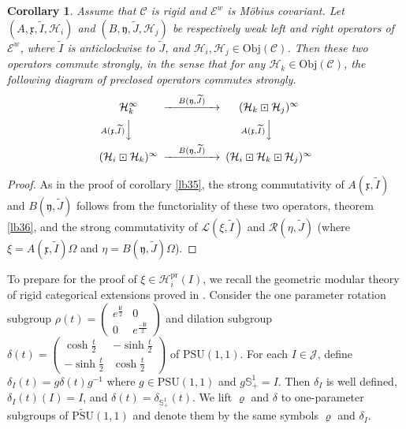 \documentclass[12pt,a4paper]{article}
\theoremstyle{definition}
\theoremstyle{plain}
\newtheorem{co}[df]{Corollary}
\newcommand{\fk}{\mathfrak}
\newcommand{\mc}{\mathcal}
\newcommand{\wtd}{\widetilde}
\newcommand{\PSU}{\mathrm{PSU}(1,1)}
\newcommand{\UPSU}{\widetilde{\mathrm{PSU}}(1,1)}
\newcommand{\scr}{\mathscr}
\newcommand{\im}{\mathbf{i}}
\newcommand{\mbb}{\mathbb}
\newcommand{\Obj}{\mathrm{Obj}}
\newcommand{\pr}{\mathrm{pr}}
\numberwithin{equation}{subsection}
\begin{document}
\begin{co}\label{lb41}
Assume that $\scr C$ is rigid and $\scr E^w$ is M\"obius covariant. Let $(A,\fk x,\wtd I,\mc H_i)$ and $(B,\fk y,\wtd J,\mc H_j)$ be respectively weak left and right operators of $\scr E^w$, where $\wtd I$ is anticlockwise to $\wtd J$, and $\mc H_i,\mc H_j\in\Obj(\scr C)$. Then these two operators commute strongly, in the sense that for any $\mc H_k\in\Obj(\scr C)$, the following diagram of preclosed operators commutes strongly.
\begin{align}
\begin{CD}
\mc H_k^\infty @> \quad B(\fk y,\wtd J)\quad   >> (\mc H_k\boxdot\mc H_j)^\infty\\
@V A(\fk x,\wtd I)   V  V @V A(\fk x,\wtd I) VV\\
(\mc H_i\boxdot\mc H_k)^\infty @> \quad B(\fk y,\wtd J) \quad  >> (\mc H_i\boxdot\mc H_k\boxdot\mc H_j)^\infty
\end{CD}
\end{align}
\end{co}

\begin{proof}
As in the proof of corollary \ref{lb35}, the strong commutativity of $A(\fk x,\wtd I)$ and $B(\fk y,\wtd J)$ follows from the functoriality of these two operators, theorem \ref{lb36}, and the strong commutativity of $\scr L(\xi,\wtd I)$ and $\scr R(\eta,\wtd J)$ (where $\xi=A(\fk x,\wtd I)\Omega$ and $\eta=B(\fk y,\wtd J)\Omega$).
\end{proof}


To prepare for the proof of $\xi\in\mc H_i^\pr(I)$, we recall the geometric modular theory of rigid categorical extensions proved in \cite{Gui21b}. Consider the one parameter rotation subgroup  $\rho(t)=\left( \begin{array}{cc}
e^{\frac{\im t}2} & 0 \\
0 &e^{\frac{-\im t}2}
\end{array} \right)$ and dilation subgroup $\delta(t)=\left( \begin{array}{cc}
\cosh\frac t2 & -\sinh\frac t2 \\
-\sinh\frac t2 &\cosh\frac t2
\end{array} \right)$ of $\PSU$. For each $I\in\mc J$, define $\delta_I(t)=g\delta(t)g^{-1}$ where $g\in\PSU$ and $g\mbb S^1_+=I$. Then $\delta_I$ is well defined, $\delta_I(t)(I)=I$, and $\delta(t)=\delta_{\mbb S^1_+}(t)$. We lift $\varrho$ and $\delta$ to one-parameter subgroups of $\UPSU$ and denote them by the same symbols $\varrho$ and $\delta_I$.
\end{document}
